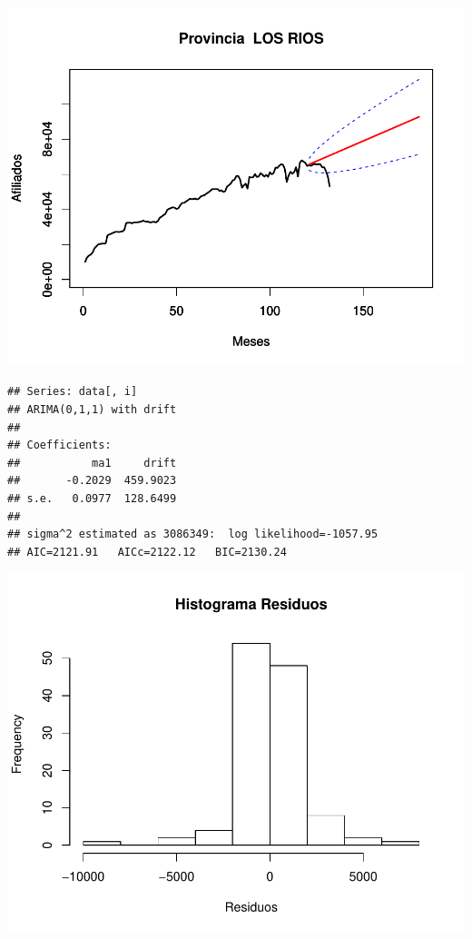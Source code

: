 \documentclass[11pt,a4paper,oneside]{article}\usepackage[]{graphicx}\usepackage[]{color}
\makeatletter
\def\maxwidth{ %
  \ifdim\Gin@nat@width>\linewidth
    \linewidth
  \else
    \Gin@nat@width
  \fi
}
\newenvironment{kframe}{%
 \def\at@end@of@kframe{}%
 \ifinner\ifhmode%
  \def\at@end@of@kframe{\end{minipage}}%
  \begin{minipage}{\columnwidth}%
 \fi\fi%
 \def\FrameCommand##1{\hskip\@totalleftmargin \hskip-\fboxsep
 \colorbox{shadecolor}{##1}\hskip-\fboxsep
     \hskip-\linewidth \hskip-\@totalleftmargin \hskip\columnwidth}%
 \MakeFramed {\advance\hsize-\width
   \@totalleftmargin\z@ \linewidth\hsize
   \@setminipage}}%
 {\par\unskip\endMakeFramed%
 \at@end@of@kframe}
\newenvironment{knitrout}{}{} %
\makeatother
\begin{document}
\begin{knitrout}
{\centering \includegraphics[width=\maxwidth]{figure/unnamed-chunk-16-37} 

}


\begin{kframe}\begin{verbatim}
## Series: data[, i] 
## ARIMA(0,1,1) with drift         
## 
## Coefficients:
##           ma1     drift
##       -0.2029  459.9023
## s.e.   0.0977  128.6499
## 
## sigma^2 estimated as 3086349:  log likelihood=-1057.95
## AIC=2121.91   AICc=2122.12   BIC=2130.24
\end{verbatim}
\end{kframe}

{\centering \includegraphics[width=\maxwidth]{figure/unnamed-chunk-16-38} 

}
\end{knitrout}
\end{document}

